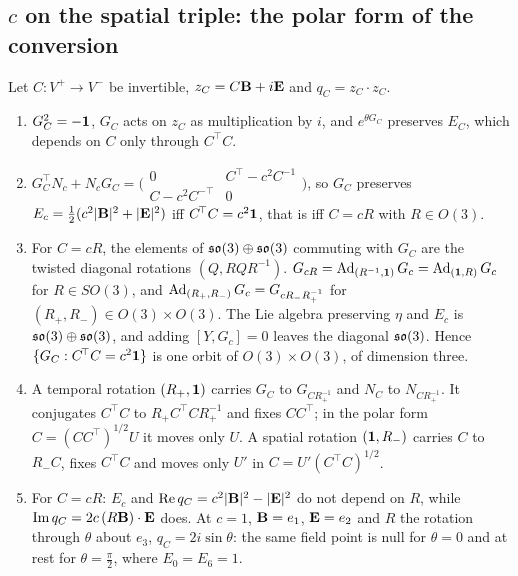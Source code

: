 \subsection{\texorpdfstring{$c$}{c} on the spatial triple: the polar form of the conversion}
\label{e6:sec:polar}

\begin{proposition}
\label{e6:prop:polar}
Let $C\colon V^+\to V^-$ be invertible, $z_C=C\mathbf B+i\mathbf E$ and $q_C=z_C\cdot z_C$.
\begin{enumerate}[label=(\roman*),leftmargin=2.2em]
\item $G_C^2=-\mathbf 1$, $G_C$ acts on $z_C$ as multiplication by $i$, and $e^{\theta G_C}$ preserves $E_C$, which depends on $C$ only through $C^{\!\top}C$.
\item $G_C^{\!\top}N_c+N_cG_C=\bigl(\begin{smallmatrix}0&C^{\!\top}-c^2C^{-1}\\ C-c^2C^{-\top}&0\end{smallmatrix}\bigr)$, so $G_C$ preserves
$E_c=\tfrac12(c^2|\mathbf B|^2+|\mathbf E|^2)$ iff $C^{\!\top}C=c^2\mathbf 1$, that is iff $C=cR$ with $R\in O(3)$.
\item For $C=cR$, the elements of $\mathfrak{so}(3)\oplus\mathfrak{so}(3)$ commuting with $G_C$ are the twisted diagonal rotations $(Q,RQR^{-1})$. $G_{cR}=\operatorname{Ad}_{(R^{-1},\mathbf 1)}G_c=\operatorname{Ad}_{(\mathbf 1,R)}G_c$
for $R\in SO(3)$, and $\operatorname{Ad}_{(R_+,R_-)}G_c=G_{cR_-R_+^{-1}}$ for $(R_+,R_-)\in O(3)\times O(3)$. The Lie algebra preserving $\eta$ and $E_c$ is
$\mathfrak{so}(3)\oplus\mathfrak{so}(3)$, and adding $[Y,G_c]=0$ leaves the diagonal $\mathfrak{so}(3)$. Hence $\{G_C:C^{\!\top}C=c^2\mathbf 1\}$ is one orbit of $O(3)\times O(3)$, of dimension three.
\item A temporal rotation $(R_+,\mathbf 1)$ carries $G_C$ to $G_{CR_+^{-1}}$ and $N_C$ to $N_{CR_+^{-1}}$. It conjugates $C^{\!\top}C$ to $R_+C^{\!\top}CR_+^{-1}$ and fixes
$CC^{\!\top}$; in the polar form $C=(CC^{\!\top})^{1/2}U$ it moves only $U$. A spatial rotation $(\mathbf 1,R_-)$ carries $C$ to $R_-C$, fixes $C^{\!\top}C$ and
moves only $U'$ in $C=U'(C^{\!\top}C)^{1/2}$.
\item For $C=cR$: $E_c$ and $\operatorname{Re} q_C=c^2|\mathbf B|^2-|\mathbf E|^2$ do not depend on $R$, while $\operatorname{Im} q_C=2c\,(R\mathbf B)\cdot\mathbf E$ does. At $c=1$, $\mathbf B=e_1$, $\mathbf E=e_2$ and $R$ the
rotation through $\theta$ about $e_3$, $q_C=2i\sin\theta$: the same field point is null for $\theta=0$ and at rest for $\theta=\tfrac\pi2$, where
$E_0=E_6=1$.
\end{enumerate}
\end{proposition}

